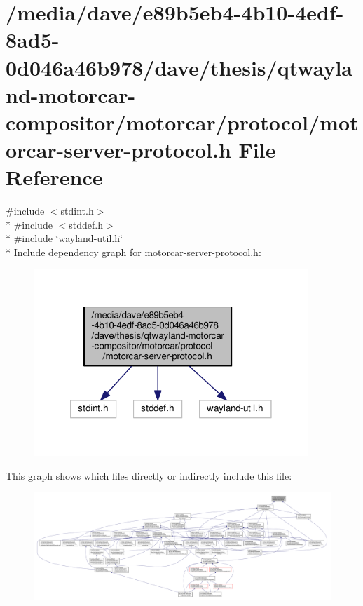 \hypertarget{protocol_2motorcar-server-protocol_8h}{\section{/media/dave/e89b5eb4-\/4b10-\/4edf-\/8ad5-\/0d046a46b978/dave/thesis/qtwayland-\/motorcar-\/compositor/motorcar/protocol/motorcar-\/server-\/protocol.h File Reference}
\label{protocol_2motorcar-server-protocol_8h}
}
{\ttfamily \#include $<$stdint.\-h$>$}\\*
{\ttfamily \#include $<$stddef.\-h$>$}\\*
{\ttfamily \#include \char`\"{}wayland-\/util.\-h\char`\"{}}\\*
Include dependency graph for motorcar-\/server-\/protocol.h\-:\nopagebreak
\begin{figure}[H]
\begin{center}
\leavevmode
\includegraphics[width=294pt]{protocol_2motorcar-server-protocol_8h__incl}
\end{center}
\end{figure}
This graph shows which files directly or indirectly include this file\-:\nopagebreak
\begin{figure}[H]
\begin{center}
\leavevmode
\includegraphics[width=350pt]{protocol_2motorcar-server-protocol_8h__dep__incl}
\end{center}
\end{figure}
